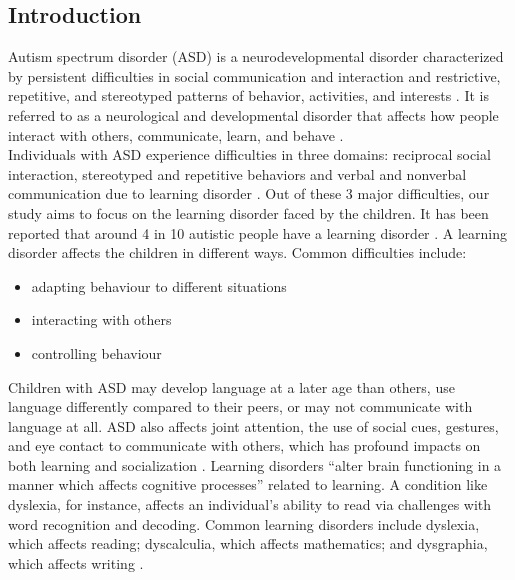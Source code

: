 \documentclass{article}
\begin{document}
\begin{multicols}{2}

\section{Introduction}
\hspace*{\parindent}  Autism spectrum disorder (ASD) is a neurodevelopmental disorder characterized by persistent difficulties in social communication and interaction and restrictive, repetitive, and stereotyped patterns of behavior, activities, and interests \cite{rosello2018adhd}. It is referred to as a neurological and developmental disorder that affects how people interact with others, communicate, learn, and behave \cite{yamamoto2021children}.\\
\hspace*{\parindent} Individuals with ASD experience difficulties in three domains: reciprocal social interaction, stereotyped and repetitive behaviors and verbal and nonverbal communication due to learning disorder \cite{starr2006schools}. Out of these 3 major difficulties, our study aims to focus on the learning disorder faced by the children. It has been reported that around 4 in 10 autistic people have a learning disorder \cite{autistica2023learningdisability}. A learning disorder affects the children in different ways. Common difficulties include: 
\begin{itemize}
    \item adapting behaviour to different situations
    \item interacting with others
    \item controlling behaviour
\end{itemize} 
\hspace*{\parindent} Children with ASD may develop language at a later age than others, use language differently compared to their peers, or may not communicate with language at all. ASD also affects joint attention, the use of social cues, gestures, and eye contact to communicate with others, which has profound impacts on both learning and socialization \cite{SpectrumofHope2023AutismLearningDisorders}. Learning disorders “alter brain functioning in a manner which affects cognitive processes” related to learning. A condition like dyslexia, for instance, affects an individual’s ability to read via challenges with word recognition and decoding. Common learning disorders include dyslexia, which affects reading; dyscalculia, which affects mathematics; and dysgraphia, which affects writing \cite{sun2019learning}. 

\end{multicols}
\end{document}
